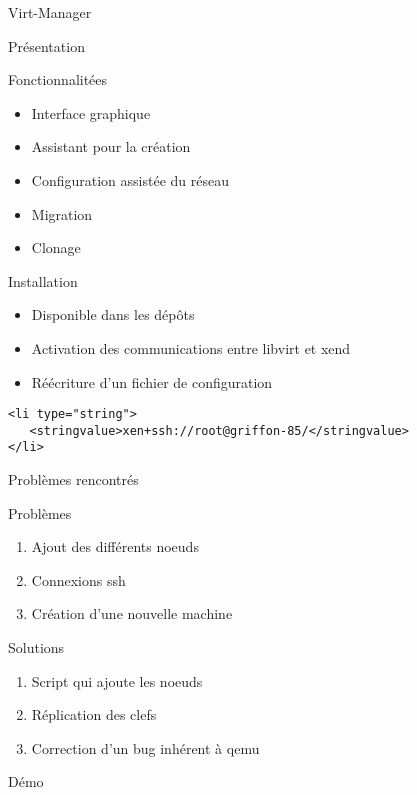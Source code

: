 
\begin{frame}
  \begin{center}
   \huge{Virt-Manager}
  \end{center}
\end{frame}

\begin{frame}{Présentation}
  \begin{block}{Fonctionnalitées}
    \begin{itemize}
    \item Interface graphique
      \pause
    \item Assistant pour la création
      \pause
    \item Configuration assistée du réseau
      \pause
    \item Migration
      \pause
    \item Clonage
    \end{itemize}
  \end{block}
\end{frame}
\begin{frame}[fragile]{Installation}
  \begin{itemize}
    \item Disponible dans les dépôts
\pause
    \item Activation des communications entre libvirt et xend
\pause
    \item Réécriture d'un fichier de configuration
  \end{itemize}
\begin{lstlisting}
<li type="string">
   <stringvalue>xen+ssh://root@griffon-85/</stringvalue>
</li>
\end{lstlisting}
\end{frame}
\begin{frame}{Problèmes rencontrés}
 \begin{alertblock}{Problèmes}
   \begin{enumerate}
     \item Ajout des différents noeuds
       \pause
     \item Connexions ssh
       \pause
     \item Création d'une nouvelle machine
       \pause
   \end{enumerate}
 \end{alertblock}
\pause
 \begin{exampleblock}{Solutions}
   \begin{enumerate}
     \item Script qui ajoute les noeuds
       \pause
     \item Réplication des clefs
       \pause
     \item Correction d'un bug inhérent à qemu
   \end{enumerate}
 \end{exampleblock}
\end{frame}

\begin{frame}{Démo}
\end{frame}


